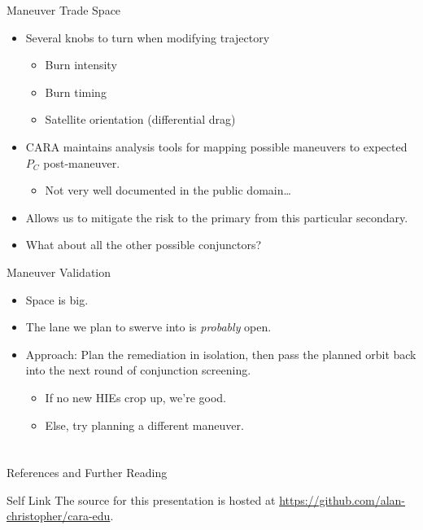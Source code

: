 \documentclass[pdf]{beamer}
\makeatletter
\def\beamer@writeslidentry@miniframesoff{%
  \expandafter\beamer@ifempty\expandafter{\beamer@framestartpage}{}%
  {%
    \clearpage\beamer@notesactions%
  }
}
\newcommand*{\miniframesoff}{\let\beamer@writeslidentry=\beamer@writeslidentry@miniframesoff}
\makeatother
\begin{document}
\begin{frame}{Maneuver Trade Space}
  \begin{itemize}
  \item Several knobs to turn when modifying trajectory
    \begin{itemize}
    \item Burn intensity
    \item Burn timing
    \item Satellite orientation (differential drag)
    \end{itemize}
  \item CARA maintains analysis tools for mapping possible maneuvers to expected
    $P_C$ post-maneuver.
    \begin{itemize}
    \item Not very well documented in the public domain\ldots
    \end{itemize}
  \item Allows us to mitigate the risk to the primary from this particular
    secondary.
  \item What about all the other possible conjunctors?
  \end{itemize}
\end{frame}

\begin{frame}{Maneuver Validation}
  \begin{itemize}
  \item Space is big.
  \item The lane we plan to swerve into is \emph{probably} open.
  \item Approach: Plan the remediation in isolation, then pass the planned orbit back into the next round of conjunction screening.
    \begin{itemize}
    \item If no new HIEs crop up, we're good.
    \item Else, try planning a different maneuver.
    \end{itemize}
  \end{itemize}
\end{frame}

\miniframesoff
\section*{}
\begin{frame}{References and Further Reading}
  \AtNextBibliography{\tiny}
  \nocite{*}
  \printbibliography
\end{frame}

\begin{frame}{Self Link}
  The source for this presentation is hosted at
\url{https://github.com/alan-christopher/cara-edu}.

\end{frame}
\end{document}
